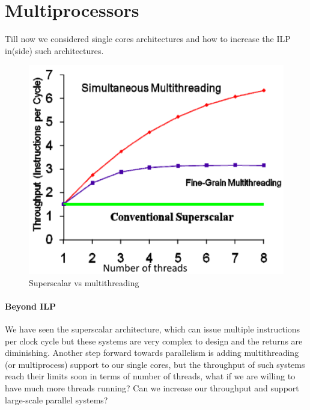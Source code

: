 
\section{Multiprocessors}\label{sec:multiprocessors}
Till now we considered single cores architectures and how to increase the ILP in(side) such architectures.

\begin{figure}[h]
    \centering
    \includegraphics[scale = 0.4]{images/superscalar-vs-multithreading}
    \caption{Superscalar vs multithreading}
    \label{fig:superscalar-vs-multithreading}
\end{figure}

\paragraph{Beyond ILP}
We have seen the superscalar architecture, which can issue multiple instructions per clock cycle but these systems are
very complex to design and the returns are diminishing.
Another step forward towards parallelism is adding multithreading (or multiprocess) support to our single cores, but
the throughput of such systems reach their limits soon in terms of number of threads, what if we are willing to
have much more threads running?
Can we increase our throughput and support large-scale parallel systems?

